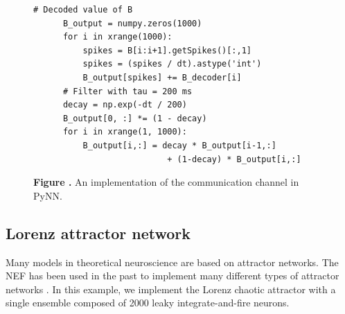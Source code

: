 \documentclass{frontiersSCNS}
\begin{document}
\begin{figure}
\begin{center}
\begin{minipage}{.495\textwidth}
\begin{lstlisting}[basicstyle={\footnotesize\ttfamily}]
      # Decoded value of B
      B_output = numpy.zeros(1000)
      for i in xrange(1000):
          spikes = B[i:i+1].getSpikes()[:,1]
          spikes = (spikes / dt).astype('int')
          B_output[spikes] += B_decoder[i]
      # Filter with tau = 200 ms
      decay = np.exp(-dt / 200)
      B_output[0, :] *= (1 - decay)
      for i in xrange(1, 1000):
          B_output[i,:] = decay * B_output[i-1,:]
                           + (1-decay) * B_output[i,:]
    \end{lstlisting}
  \end{minipage}
\end{center}
 \textbf{\label{fig:pynn} Figure .}{
   An implementation of the communication channel in PyNN.}
\end{figure}

\subsection{Lorenz attractor network} \label{sec:lorenz}

Many models in theoretical neuroscience
are based on attractor networks.
The NEF has been used in the past
to implement many different types of
attractor networks \cite{TODO}.
In this example,
we implement the Lorenz chaotic attractor
with a single ensemble
composed of 2000 leaky integrate-and-fire neurons.
\end{document}
